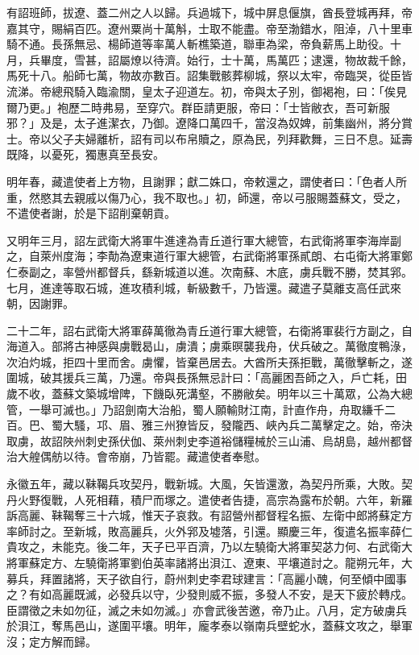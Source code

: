 \begin{pinyinscope}
 有詔班師，拔遼、蓋二州之人以歸。兵過城下，城中屏息偃旗，酋長登城再拜，帝嘉其守，賜絹百匹。遼州粟尚十萬斛，士取不能盡。帝至渤錯水，阻淖，八十里車騎不通。長孫無忌、楊師道等率萬人斬樵築道，聯車為梁，帝負薪馬上助役。十月，兵畢度，雪甚，詔屬燎以待濟。始行，士十萬，馬萬匹；逮還，物故裁千餘，馬死十八。船師七萬，物故亦數百。詔集戰骸葬柳城，祭以太牢，帝臨哭，從臣皆流涕。帝總飛騎入臨渝關，皇太子迎道左。初，帝與太子別，御褐袍，曰：「俟見爾乃更。」袍歷二時弗易，至穿穴。群臣請更服，帝曰：「士皆敝衣，吾可新服邪？」及是，太子進潔衣，乃御。遼降口萬四千，當沒為奴婢，前集幽州，將分賞士。帝以父子夫婦離析，詔有司以布帛贖之，原為民，列拜歡舞，三日不息。延壽既降，以憂死，獨惠真至長安。



 明年春，藏遣使者上方物，且謝罪；獻二姝口，帝敕還之，謂使者曰：「色者人所重，然愍其去親戚以傷乃心，我不取也。」初，師還，帝以弓服賜蓋蘇文，受之，不遣使者謝，於是下詔削棄朝貢。



 又明年三月，詔左武衛大將軍牛進達為青丘道行軍大總管，右武衛將軍李海岸副之，自萊州度海；李勣為遼東道行軍大總管，右武衛將軍孫貳朗、右屯衛大將軍鄭仁泰副之，率營州都督兵，繇新城道以進。次南蘇、木底，虜兵戰不勝，焚其郛。七月，進達等取石城，進攻積利城，斬級數千，乃皆還。藏遣子莫離支高任武來朝，因謝罪。



 二十二年，詔右武衛大將軍薛萬徹為青丘道行軍大總管，右衛將軍裴行方副之，自海道入。部將古神感與虜戰曷山，虜潰；虜乘暝襲我舟，伏兵破之。萬徹度鴨淥，次泊灼城，拒四十里而舍。虜懼，皆棄邑居去。大酋所夫孫拒戰，萬徹擊斬之，遂圍城，破其援兵三萬，乃還。帝與長孫無忌計曰：「高麗困吾師之入，戶亡耗，田歲不收，蓋蘇文築城增陴，下饑臥死溝壑，不勝敝矣。明年以三十萬眾，公為大總管，一舉可滅也。」乃詔劍南大治船，蜀人願輸財江南，計直作舟，舟取縑千二百。巴、蜀大騷，邛、眉、雅三州獠皆反，發隴西、峽內兵二萬擊定之。始，帝決取虜，故詔陜州刺史孫伏伽、萊州刺史李道裕儲糧械於三山浦、烏胡島，越州都督治大艎偶舫以待。會帝崩，乃皆罷。藏遣使者奉慰。



 永徽五年，藏以靺鞨兵攻契丹，戰新城。大風，矢皆還激，為契丹所乘，大敗。契丹火野復戰，人死相藉，積尸而塚之。遣使者告捷，高宗為露布於朝。六年，新羅訴高麗、靺鞨奪三十六城，惟天子哀救。有詔營州都督程名振、左衛中郎將蘇定方率師討之。至新城，敗高麗兵，火外郛及墟落，引還。顯慶三年，復遣名振率薛仁貴攻之，未能克。後二年，天子已平百濟，乃以左驍衛大將軍契苾力何、右武衛大將軍蘇定方、左驍衛將軍劉伯英率諸將出浿江、遼東、平壤道討之。龍朔元年，大募兵，拜置諸將，天子欲自行，蔚州刺史李君球建言：「高麗小醜，何至傾中國事之？有如高麗既滅，必發兵以守，少發則威不振，多發人不安，是天下疲於轉戍。臣謂徵之未如勿征，滅之未如勿滅。」亦會武後苦邀，帝乃止。八月，定方破虜兵於浿江，奪馬邑山，遂圍平壤。明年，龐孝泰以嶺南兵壁蛇水，蓋蘇文攻之，舉軍沒；定方解而歸。




\end{pinyinscope}
